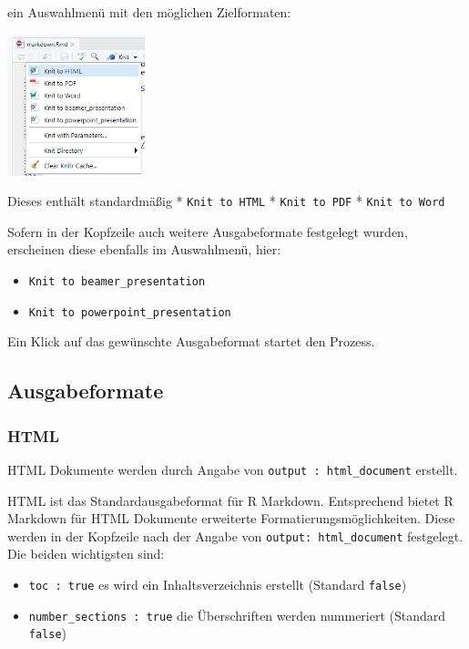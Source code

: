\documentclass[
]{article}
\providecommand{\tightlist}{%
  \setlength{\itemsep}{0pt}\setlength{\parskip}{0pt}}
\begin{document}
ein Auswahlmenü mit den möglichen Zielformaten:

\includegraphics[width=0.3\textwidth,height=\textheight]{./images/RStudio_GUI_knit_select.png}

Dieses enthält standardmäßig * \texttt{Knit\ to\ HTML} *
\texttt{Knit\ to\ PDF} * \texttt{Knit\ to\ Word}

Sofern in der Kopfzeile auch weitere Ausgabeformate festgelegt wurden,
erscheinen diese ebenfalls im Auswahlmenü, hier:

\begin{itemize}
\tightlist
\item
  \texttt{Knit\ to\ beamer\_presentation}
\item
  \texttt{Knit\ to\ powerpoint\_presentation}
\end{itemize}

Ein Klick auf das gewünschte Ausgabeformat startet den Prozess.

\hypertarget{ausgabeformate}{%
\subsection{Ausgabeformate}\label{ausgabeformate}}

\hypertarget{html}{%
\subsubsection{HTML}\label{html}}

HTML Dokumente werden durch Angabe von
\texttt{output\ :\ html\_document} erstellt.

HTML ist das Standardausgabeformat für R Markdown. Entsprechend bietet R
Markdown für HTML Dokumente erweiterte Formatierungsmöglichkeiten. Diese
werden in der Kopfzeile nach der Angabe von
\texttt{output:\ html\_document} festgelegt. Die beiden wichtigsten
sind:

\begin{itemize}
\tightlist
\item
  \texttt{toc\ :\ true} es wird ein Inhaltsverzeichnis erstellt
  (Standard \texttt{false})
\item
  \texttt{number\_sections\ :\ true} die Überschriften werden nummeriert
  (Standard \texttt{false})
\end{itemize}
\end{document}
